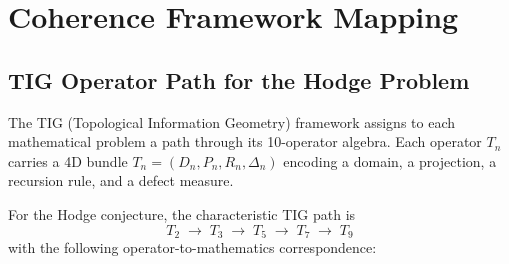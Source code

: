 \documentclass[11pt]{article}
\theoremstyle{definition}
\begin{document}
\section{Coherence Framework Mapping}
\label{sec:framework}

\subsection{TIG Operator Path for the Hodge Problem}

The TIG (Topological Information Geometry) framework assigns to each
mathematical problem a path through its 10-operator algebra.  Each operator
$T_n$ carries a 4D bundle $T_n = (D_n, P_n, R_n, \Delta_n)$ encoding
a domain, a projection, a recursion rule, and a defect measure.

For the Hodge conjecture, the characteristic TIG path is
\[
  T_2 \;\to\; T_3 \;\to\; T_5 \;\to\; T_7 \;\to\; T_9
\]
with the following operator-to-mathematics correspondence:
\end{document}
